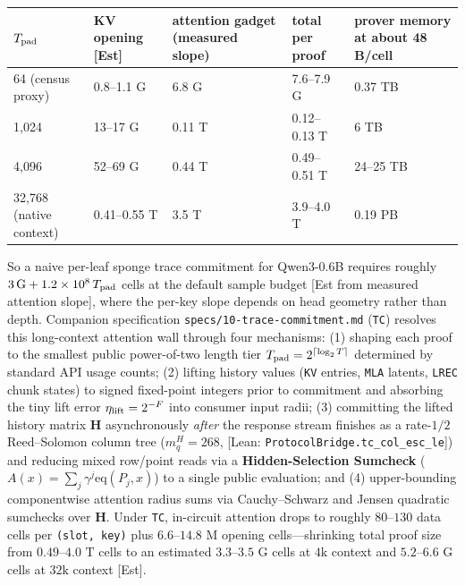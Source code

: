 \documentclass[10pt]{article}
\begin{document}
\begin{center}\small
\begin{tabularx}{\linewidth}{YYYYY}
\toprule
{}\textbf{$T_{\rm pad}$} & {}\textbf{KV opening [Est]} & {}\textbf{attention gadget (measured slope)} & {}\textbf{total per proof} & {}\textbf{prover memory at about 48 B/cell} \\
\midrule
{}64 (census proxy) & {}0.8--1.1 G & {}6.8 G & {}7.6--7.9 G & {}0.37 TB \\
{}1,024 & {}13--17 G & {}0.11 T & {}0.12--0.13 T & {}6 TB \\
{}4,096 & {}52--69 G & {}0.44 T & {}0.49--0.51 T & {}24--25 TB \\
{}32,768 (native context) & {}0.41--0.55 T & {}3.5 T & {}3.9--4.0 T & {}0.19 PB \\
\bottomrule
\end{tabularx}
\end{center}

So a naive per-leaf sponge trace commitment for Qwen3-0.6B requires roughly $3\,\mathrm G+1.2\times10^8\,T_{\rm pad}$ cells at the default sample budget [Est from measured attention slope], where the per-key slope depends on head geometry rather than depth. Companion specification \texttt{specs/10-trace-commitment.\allowbreak{}md} (\texttt{TC}) resolves this long-context attention wall through four mechanisms: (1) shaping each proof to the smallest public power-of-two length tier $T_{\rm pad}=2^{\lceil\log_2 T\rceil}$ determined by standard API usage counts; (2) lifting history values (\texttt{KV} entries, \texttt{MLA} latents, \texttt{LREC} chunk states) to signed fixed-point integers prior to commitment and absorbing the tiny lift error $\eta_{\rm lift}=2^{-F}$ into consumer input radii; (3) committing the lifted history matrix $\mathbf H$ asynchronously \emph{after} the response stream finishes as a rate-$1/2$ Reed--Solomon column tree ($m_q^H=268$, [Lean: \texttt{ProtocolBridge.\allowbreak{}tc\_\allowbreak{}col\_\allowbreak{}esc\_\allowbreak{}le}]) and reducing mixed row/point reads via a \textbf{Hidden-Selection Sumcheck} ($A(x)=\sum_j\gamma^j\mathrm{eq}(P_j,x)$) to a single public evaluation; and (4) upper-bounding componentwise attention radius sums via Cauchy--Schwarz and Jensen quadratic sumchecks over $\mathbf H$. Under \texttt{TC}, in-circuit attention drops to roughly $80$--$130$ data cells per \texttt{(slot, key)} plus $6.6$--$14.8\text{ M}$ opening cells---shrinking total proof size from $0.49$--$4.0\text{ T}$ cells to an estimated $3.3$--$3.5\text{ G}$ cells at $4\text{k}$ context and $5.2$--$6.6\text{ G}$ cells at $32\text{k}$ context [Est].
\end{document}
